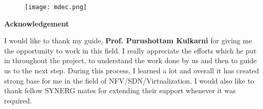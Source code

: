 \documentclass[a4paper,11pt]{report}
\begin{document}
\newpage
\begin{figure}[h]
\texttt{[image: mdec.png]}
\end{figure}


\newpage
\vspace*{3cm}
{\center \textbf {Acknowledgement}\\}

\vspace{0.5cm}
\noindent I would like to thank my guide, \textbf {Prof. Purushottam Kulkarni} for giving me the opportunity to work in this field. I really appreciate the efforts which he put in throughout the project, to understand the work done by us and then to guide us to the next step. During this process, I learned a lot and overall it has created strong base for me in the field of NFV/SDN/Virtualization. I would also like to thank fellow SYNERG mates for extending their support whenever it was required.   
\newpage
\end{document}

